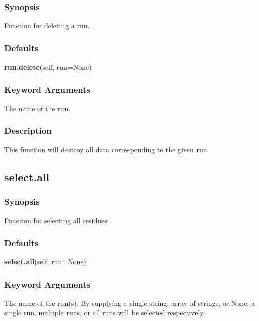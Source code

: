 \subsubsection{Synopsis}

Function for deleting a run.



\subsubsection{Defaults}

\textsf{\textbf{run.delete}(self, run=None)}


\subsubsection{Keyword Arguments}

  The name of the run. 




\subsubsection{Description}

This function will destroy all data corresponding to the given run.




\newpage

\subsection{select.all}


\subsubsection{Synopsis}

Function for selecting all residues.



\subsubsection{Defaults}

\textsf{\textbf{select.all}(self, run=None)}


\subsubsection{Keyword Arguments}

  The name of the run(s).  By supplying a single string, array of strings, or None, a single run, multiple runs, or all runs will be selected respectively. 





